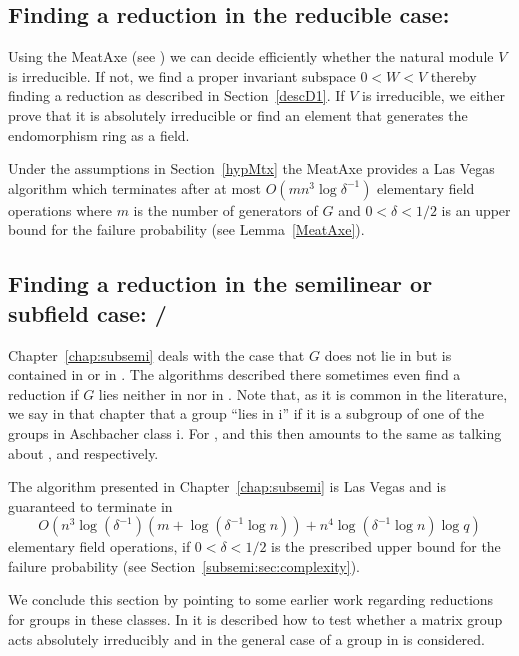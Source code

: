 \subsection{Finding a reduction in the reducible case: }
\label{solveC1}

Using the MeatAxe (see \cite{MeatAxeHoltRees, IL, MeatAxeRP}) we can
decide efficiently whether the natural module $V$ is
irreducible. If not, we find a proper invariant subspace $0<W<V$
thereby finding a reduction as described in Section~\ref{descD1}. 
If $V$ is irreducible, we either prove
that it is absolutely irreducible or find an element that generates
the endomorphism ring as a field.

Under the assumptions in Section~\ref{hypMtx} the MeatAxe provides a
Las Vegas algorithm which terminates
after at most $O(mn^3\log \delta^{-1})$ elementary field operations where $m$
is the number of generators of $G$ and $0 < \delta < 1/2$ is an upper
bound for the failure probability (see Lemma~\ref{MeatAxe}).


\subsection{Finding a reduction in the semilinear or subfield case:
/}
\label{solveC3C5}

Chapter~\ref{chap:subsemi} deals with the case that $G$ does not lie
in  but is contained in  or in . The algorithms described
there sometimes even find a reduction if $G$ lies neither in  nor
in . Note that, as it is common in the literature, we say in that
chapter that a group ``lies in \CC i'' if it is a subgroup of one of
the groups in Aschbacher class \CC i. For ,  and  this then 
amounts to the same as talking about ,  and  respectively.

The algorithm presented in Chapter~\ref{chap:subsemi} is Las Vegas and is
guaranteed to terminate in 
\[ O(n^3\log(\delta^{-1})(m+\log(\delta^{-1} \log n))
   + n^4\log(\delta^{-1} \log n) \log q) \]
elementary field operations,
if $0 < \delta < 1/2$ is the prescribed upper bound for the failure
probability (see Section~\ref{subsemi:sec:complexity}).

We conclude this section by pointing to some earlier work regarding
reductions for groups in these classes. In \cite{MeatAxeHoltRees} it
is described how to test whether a matrix group acts absolutely
irreducibly and in \cite{smashnormal} the general case of a group
in  is considered.

